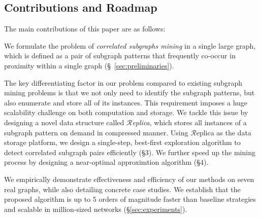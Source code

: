 \subsection{Contributions and Roadmap}
The main contributions of this paper are as follows:
\squishlist
\item We formulate the problem of \emph{correlated subgraphs mining} in a single large graph, which is defined as a pair of subgraph patterns that frequently
co-occur in proximity within a single graph (\S~\ref{sec:preliminaries}).
\item The key differentiating factor in our problem compared to existing subgraph mining problems is that we not only need to identify the subgraph patterns, but also enumerate and store all of its instances. This requirement imposes a huge scalability challenge on both computation and storage. We tackle this issue by designing a novel data structure called \emph{$\mathcal{R}$eplica}, which stores all instances of a subgraph pattern on demand in compressed manner. %
 Using $\mathcal{R}$eplica as the data storage platform, we design a single-step, best-first exploration algorithm to detect correlated subgraph pairs efficiently (\S 3). We further speed up the mining process by designing a near-optimal approximtion algorithm (\S 4).
\item We empirically demonstrate effectiveness and efficiency of our methods on seven real graphs, while also detailing concrete case studies. We establish that the proposed algorithm is up to $5$ orders of magnitude faster than baseline strategies and scalable in million-sized networks (\S \ref{sec:experiments}).
\squishend
